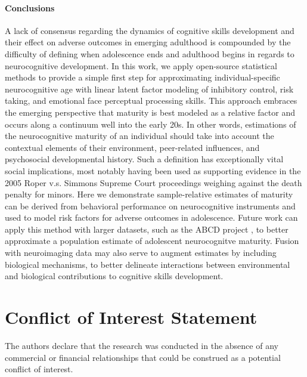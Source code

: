 \documentclass[utf8]{stylesheet}
\begin{document}
\paragraph*{Conclusions} A lack of consensus regarding the dynamics of cognitive skills development and their effect on adverse outcomes in emerging adulthood is compounded by the difficulty of defining when adolescence ends and adulthood begins in regards to neurocognitive development. In this work, we apply open-source statistical methods to provide a simple first step for approximating individual-specific neurocognitive age with linear latent factor modeling of inhibitory control, risk taking, and emotional face perceptual processing skills. This approach embraces the emerging perspective that maturity is best modeled as a relative factor and occurs along a continuum well into the early 20s. In other words, estimations of the neurocognitive maturity of an individual should take into account the contextual elements of their environment, peer-related influences, and psychosocial developmental history. Such a definition has exceptionally vital social implications, most notably having been used as supporting evidence in the 2005 Roper v.s. Simmons Supreme Court proceedings weighing against the death penalty for minors. Here we demonstrate sample-relative estimates of maturity can be derived from behavioral performance on neurocognitive instruments and used to model risk factors for adverse outcomes in adolescence. Future work can apply this method with larger datasets, such as the ABCD project \citep{casey2018adolescent,volkow2018conception}, to better approximate a population estimate of adolescent neurocognitve maturity. Fusion with neuroimaging data may also serve to augment estimates by including biological mechanisms, to better delineate interactions between environmental and biological contributions to cognitive skills development.

\section*{Conflict of Interest Statement}
The authors declare that the research was conducted in the absence of any commercial or financial relationships that could be construed as a potential conflict of interest.
\end{document}
